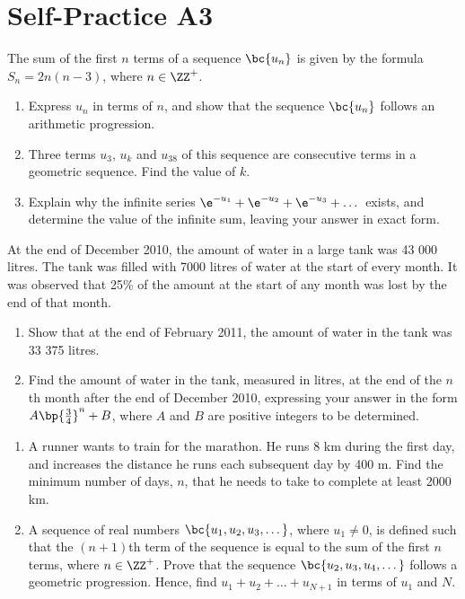 \section{Self-Practice A3}

\begin{problem}
    The sum of the first $n$ terms of a sequence $\bc{u_n}$ is given by the formula $S_n = 2n(n-3)$, where $n \in \ZZ^+$.

    \begin{enumerate}
        \item Express $u_n$ in terms of $n$, and show that the sequence $\bc{u_n}$ follows an arithmetic progression.
        \item Three terms $u_3$, $u_k$ and $u_{38}$ of this sequence are consecutive terms in a geometric sequence. Find the value of $k$.
        \item Explain why the infinite series $\e^{-u_1} + \e^{-u_2} + \e^{-u_3} + \dots$ exists, and determine the value of the infinite sum, leaving your answer in exact form.
    \end{enumerate}
\end{problem}

\begin{problem}
    At the end of December 2010, the amount of water in a large tank was 43 000 litres. The tank was filled with 7000 litres of water at the start of every month. It was observed that 25\% of the amount at the start of any month was lost by the end of that month.

    \begin{enumerate}
        \item Show that at the end of February 2011, the amount of water in the tank was 33 375 litres.
        \item Find the amount of water in the tank, measured in litres, at the end of the $n$th month after the end of December 2010, expressing your answer in the form $A\bp{\frac34}^n + B$, where $A$ and $B$ are positive integers to be determined.
    \end{enumerate}
\end{problem}

\begin{problem}
    \begin{enumerate}
        \item A runner wants to train for the marathon. He runs 8 km during the first day, and increases the distance he runs each subsequent day by 400 m. Find the minimum number of days, $n$, that he needs to take to complete at least 2000 km.
        \item A sequence of real numbers $\bc{u_1, u_2, u_3, \dots}$, where $u_1 \neq 0$, is defined such that the $(n+1)$th term of the sequence is equal to the sum of the first $n$ terms, where $n \in \ZZ^+$. Prove that the sequence $\bc{u_2, u_3, u_4, \dots}$ follows a geometric progression. Hence, find $u_1 + u_2 + \dots + u_{N+1}$ in terms of $u_1$ and $N$.
    \end{enumerate}
\end{problem}


